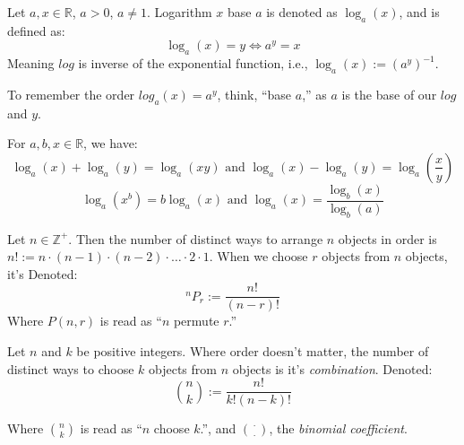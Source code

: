 \begin{Def}[Logarithm]

    Let $a,x\in\mathbb{R}$, $a>0$, $a\neq 1$. Logarithm $x$ base $a$ is denoted as $\log_a(x)$, and is defined as:
    \Large
    \[\log_a(x)=y\Longleftrightarrow a^y=x\]
    \normalsize
    Meaning $log$ is inverse of the exponential function, i.e., $\log_a(x):=(a^y)^{-1}$.
\end{Def}
\begin{Tip}
    To remember the order $log_a(x)=a^y$, think, ``base $a$,'' as $a$ is the base of our $log$ and $y$.
\end{Tip}

\begin{theo}

    \label{thm:logrules}
    
    For $a,b,x\in\mathbb{R}$, we have:
    \Large
    \[\log_a(x)+\log_a(y)=\log_a(xy) \text{ and } \log_a(x)-\log_a(y)=\log_a\left(\dfrac{x}{y}\right)\]
    \[\log_a(x^b)=b\log_a(x) \text{ and } \log_a(x)=\dfrac{\log_b(x)}{\log_b(a)}\]
    \normalsize
\end{theo}

\newpage

\begin{Def}[Permutations]
    
        Let $n\in\mathbb{Z^+}$. Then the number of distinct ways to arrange $n$ objects in order is\\
        $n!:=n\cdot(n-1)\cdot(n-2)\cdot\ldots\cdot2\cdot1$.
         When we choose $r$ objects from $n$ objects, it's Denoted:
        \Large
        \[^nP_r:=\dfrac{n!}{(n-r)!}\]
        \normalsize
        Where $P(n,r)$ is read as ``$n$ permute $r$.''
\end{Def}

\begin{Def}[Combinations]

    Let $n$ and $k$ be positive integers. Where order doesn't matter, the number of distinct ways to choose $k$ objects from $n$ objects is it's \textit{combination}. Denoted:
    \Large
    \[\binom{n}{k}:=\dfrac{n!}{k!(n-k)!}\]
    \normalsize

    \noindent
    Where $\binom{n}{k}$ is read as ``$n$ choose $k$.'', and $\binom{\cdot}{\cdot}$, the \textit{binomial coefficient}.
    
\end{Def}

